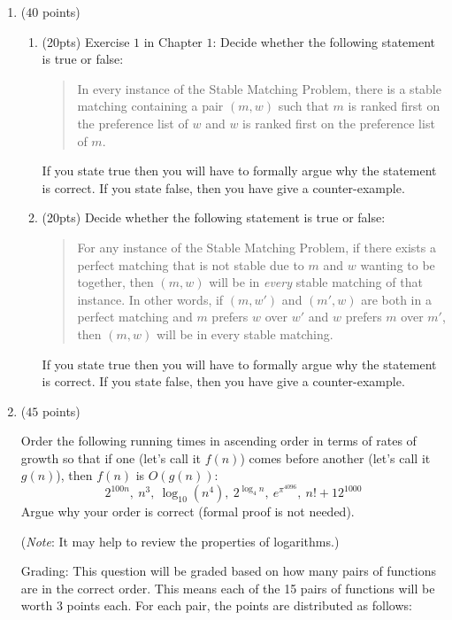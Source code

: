 \documentclass[11pt]{article}
\begin{document}
\begin{enumerate}



\item ($40$ {\sf points})
\begin{enumerate}

\item (20pts) Exercise $1$ in Chapter $1$:
Decide whether the following statement is true or false:
\begin{quote}
In every instance of the Stable Matching Problem, there is a stable matching containing a pair $(m,w)$ such that $m$ is ranked first on the preference list of $w$ and $w$ is ranked first on the preference list of $m$.
\end{quote}
If you state true then you will have to formally argue why the statement is correct. If you state false, then you have give a counter-example.


\item (20pts) Decide whether the following statement is true or false:
\begin{quote}
For any instance of the Stable Matching Problem, if there exists a perfect matching that is not stable due to $m$ and $w$ wanting to be together, then $(m,w)$ will be in {\em every} stable matching of that instance. In other words, if $(m,w')$ and $(m',w)$ are both in a perfect matching and $m$ prefers $w$ over $w'$ and $w$ prefers $m$ over $m'$, then $(m,w)$ will be in every stable matching.
\end{quote}
If you state true then you will have to formally argue why the statement is correct. If you state false, then you have give a counter-example.


\end{enumerate}


\item ($45$ {\sf points})
 
Order the following running times in
ascending order in terms of rates of growth so that if one (let's call it $f(n)$) comes before another (let's call it $g(n)$), then $f(n)$ is
$O(g(n))$:
\[2^{100n},~n^3,~\log_{10}{(n^4)},~2^{\log_4{n}},~e^{\pi^{4096}},~n!+12^{1000}\]
Argue why your order is correct (formal proof is not needed). 

(\textit{Note}: It may help to review the properties of logarithms.)

Grading: This question will be graded based on how many pairs of functions are in the correct order. This means each of the 15 pairs of functions will be worth 3 points each. For each pair, the points are distributed as follows:


\end{enumerate}
\end{document}
